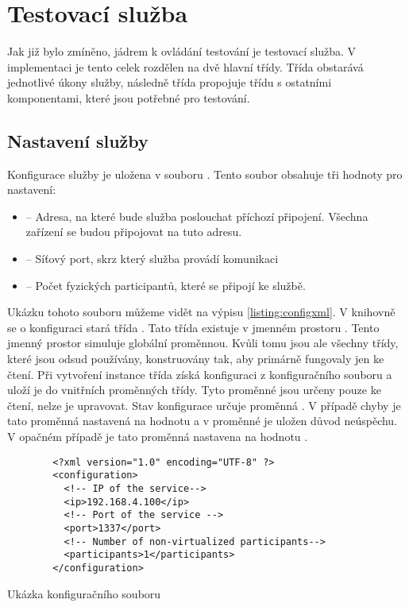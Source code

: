 \section{Testovací služba}
Jak již bylo zmíněno, jádrem k ovládání testování je testovací služba. V implementaci je tento celek rozdělen na dvě hlavní třídy. Třída  obstarává jednotlivé úkony služby, následně třída  propojuje třídu  s ostatními komponentami, které jsou potřebné pro testování.

\subsection{Nastavení služby}

Konfigurace služby je uložena v souboru . Tento soubor obsahuje tři hodnoty pro nastavení:

\begin{itemize}
    \item {} -- Adresa, na které bude služba poslouchat příchozí připojení. Všechna zařízení se budou připojovat na tuto adresu.
    \item {} -- Síťový port, skrz který služba provádí komunikaci
    \item {} -- Počet fyzických participantů, které se připojí ke službě.   
\end{itemize}

Ukázku tohoto souboru můžeme vidět na výpisu \ref{listing:configxml}. V knihovně se o konfiguraci stará třída . Tato třída existuje v jmenném prostoru . Tento jmenný prostor simuluje globální proměnnou. Kvůli tomu jsou ale všechny třídy, které jsou odsud používány, konstruovány tak, aby primárně fungovaly jen ke čtení. Při vytvoření instance třída získá konfiguraci z konfiguračního souboru a uloží je do vnitřních proměnných třídy. Tyto proměnné jsou určeny pouze ke čtení, nelze je upravovat. Stav konfigurace určuje proměnná . V případě chyby je tato proměnná nastavená na hodnotu  a v proměnné  je uložen důvod neúspěchu. V opačném případě je tato proměnná nastavena na hodnotu .

\begin{listing}[htbp]
    \centering
    \begin{verbatim}
        <?xml version="1.0" encoding="UTF-8" ?>
        <configuration>
          <!-- IP of the service-->
          <ip>192.168.4.100</ip>
          <!-- Port of the service -->
          <port>1337</port>
          <!-- Number of non-virtualized participants-->
          <participants>1</participants>
        </configuration>
    \end{verbatim}
    \caption{Ukázka konfiguračního souboru}
    \label{listing:configxml}
\end{listing}


